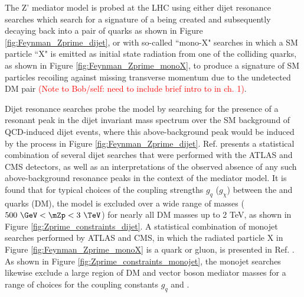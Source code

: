 The Z' mediator model is probed at the LHC using either dijet resonance searches \cite{Zprime_portal_gen} which search for a signature of a \Zprime being created and subsequently decaying back into a pair of quarks as shown in Figure \ref{fig:Feynman_Zprime_dijet}, or with so-called ``mono-X" searches \cite{Zprime_portal_monojet_dijet} in which a SM particle ``X" is emitted as initial state radiation from one of the colliding quarks, as shown in Figure \ref{fig:Feynman_Zprime_monoX}, to produce a signature of SM particles recoiling against missing transverse momentum due to the undetected DM pair \textcolor{red}{(Note to Bob/self: need to include brief intro to \met in ch. 1)}. 

Dijet resonance searches probe the model by searching for the presence of a resonant peak in the dijet invariant mass spectrum over the SM background of QCD-induced dijet events, where this above-background peak would be induced by the process in Figure \ref{fig:Feynman_Zprime_dijet}. Ref. \cite{Zprime_portal_dijet} presents a statistical combination of several dijet searches that were performed with the ATLAS and CMS detectors, as well as an interpretations of the observed absence of any such above-background resonance peaks in the context of the \Zprime mediator model. It is found that for typical choices of the coupling strengths \(g_q\) (\(g_\chi\)) between the \Zprime and quarks (DM), the model is excluded over a wide range of \Zprime masses (\(500~\GeV < \mZp < 3~\TeV\)) for nearly all DM masses up to 2 TeV, as shown in Figure \ref{fig:Zprime_constraints_dijet}. A statistical combination of monojet searches performed by ATLAS and CMS, in which the radiated particle X in Figure \ref{fig:Feynman_Zprime_monoX} is a quark or gluon, is presented in Ref. \cite{Zprime_portal_monojet_dijet}. As shown in Figure \ref{fig:Zprime_constraints_monojet}, the monojet searches likewise exclude a large region of DM and vector boson mediator masses for a range of choices for the coupling constants \(g_q\) and \gchi.

